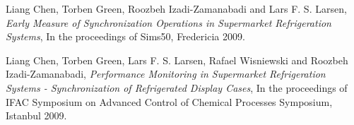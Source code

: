 \documentclass[margin,line,a4paper]{resume}
\begin{document}
\begin{resume}
Liang Chen,  Torben Green, Roozbeh Izadi-Zamanabadi and Lars F. S. Larsen,
\textit{Early Measure of Synchronization Operations in Supermarket Refrigeration Systems}, In  the proceedings of Sims50, Fredericia 2009.

Liang Chen,  Torben Green, Lars F. S. Larsen, Rafael Wisniewski and Roozbeh Izadi-Zamanabadi, \textit{Performance Monitoring in Supermarket Refrigeration Systems - Synchronization of Refrigerated Display Cases}, In the proceedings of IFAC Symposium on Advanced Control of Chemical Processes Symposium, Istanbul 2009.

\end{resume}
\end{document}
